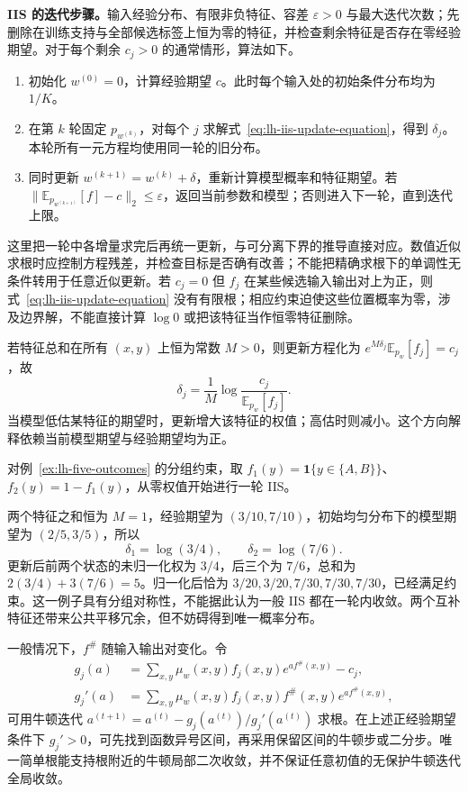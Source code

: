 \textbf{IIS 的迭代步骤。}输入经验分布、有限非负特征、容差 $\varepsilon>0$ 与最大迭代次数；先删除在训练支持与全部候选标签上恒为零的特征，并检查剩余特征是否存在零经验期望。对于每个剩余 $c_j>0$ 的通常情形，算法如下。
\begin{enumerate}
\item 初始化 $w^{(0)}=0$，计算经验期望 $c$。此时每个输入处的初始条件分布均为 $1/K$。
\item 在第 $k$ 轮固定 $p_{w^{(k)}}$，对每个 $j$ 求解式~\eqref{eq:lh-iis-update-equation}，得到 $\delta_j$。本轮所有一元方程均使用同一轮的旧分布。
\item 同时更新 $w^{(k+1)}=w^{(k)}+\delta$，重新计算模型概率和特征期望。若 $\|\mathbb E_{p_{w^{(k+1)}}}[f]-c\|_2\leq\varepsilon$，返回当前参数和模型；否则进入下一轮，直到迭代上限。
\end{enumerate}
这里把一轮中各增量求完后再统一更新，与可分离下界的推导直接对应。数值近似求根时应控制方程残差，并检查目标是否确有改善；不能把精确求根下的单调性无条件转用于任意近似更新。若 $c_j=0$ 但 $f_j$ 在某些候选输入输出对上为正，则式~\eqref{eq:lh-iis-update-equation} 没有有限根；相应约束迫使这些位置概率为零，涉及边界解，不能直接计算 $\log0$ 或把该特征当作恒零特征删除。

若特征总和在所有 $(x,y)$ 上恒为常数 $M>0$，则更新方程化为 $e^{M\delta_j}\mathbb E_{p_w}[f_j]=c_j$，故
\begin{equation}
\delta_j=\frac1M\log\frac{c_j}{\mathbb E_{p_w}[f_j]}.
\label{eq:lh-iis-constant-sum}
\end{equation}
当模型低估某特征的期望时，更新增大该特征的权值；高估时则减小。这个方向解释依赖当前模型期望与经验期望均为正。

\begin{example}
\label{ex:lh-iis-five-outcomes}
对例~\ref{ex:lh-five-outcomes} 的分组约束，取 $f_1(y)=\mathbf1\{y\in\{A,B\}\}$、$f_2(y)=1-f_1(y)$，从零权值开始进行一轮 IIS。
\end{example}
\begin{solve}
两个特征之和恒为 $M=1$，经验期望为 $(3/10,7/10)$，初始均匀分布下的模型期望为 $(2/5,3/5)$，所以
\[
\delta_1=\log(3/4),\qquad\delta_2=\log(7/6).
\]
更新后前两个状态的未归一化权为 $3/4$，后三个为 $7/6$，总和为 $2(3/4)+3(7/6)=5$。归一化后恰为 $3/20,3/20,7/30,7/30,7/30$，已经满足约束。这一例子具有分组对称性，不能据此认为一般 IIS 都在一轮内收敛。两个互补特征还带来公共平移冗余，但不妨碍得到唯一概率分布。
\end{solve}

一般情况下，$f^\#$ 随输入输出对变化。令
\begin{equation}
\begin{aligned}
g_j(a)&=\sum_{x,y}\mu_w(x,y)f_j(x,y)e^{af^\#(x,y)}-c_j,\\
g_j'(a)&=\sum_{x,y}\mu_w(x,y)f_j(x,y)f^\#(x,y)e^{af^\#(x,y)},
\end{aligned}
\label{eq:lh-iis-root-function}
\end{equation}
可用牛顿迭代 $a^{(t+1)}=a^{(t)}-g_j(a^{(t)})/g_j'(a^{(t)})$ 求根。在上述正经验期望条件下 $g_j'>0$，可先找到函数异号区间，再采用保留区间的牛顿步或二分步。唯一简单根能支持根附近的牛顿局部二次收敛，并不保证任意初值的无保护牛顿迭代全局收敛。

